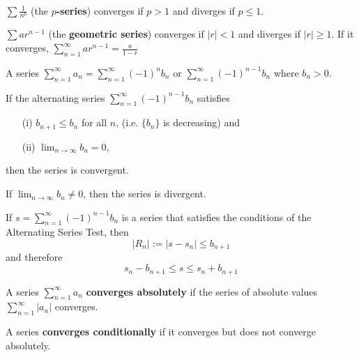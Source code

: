 \begin{theorem} \ \\
  $\sum \frac{1}{n^p}$ (the \textbf{$p$-series}) converges if $p > 1$ and diverges if $p \leq 1$.

  $\sum ar^{n-1}$ (the \textbf{geometric series}) converges if $|r| < 1$ and diverges if $|r| \geq 1$. If it converges, $\displaystyle\sum_{n=1}^\infty ar^{n-1} = \frac{a}{1-r}$
\end{theorem}

\begin{definition} A series $\sum_{n=1}^\infty a_n = \sum_{n=1}^\infty (-1)^n b_n \text{ or } \sum_{n=1}^\infty (-1)^{n - 1} b_n$ where $b_n > 0$.
\end{definition}

\begin{theorem} If the alternating series $\sum_{n=1}^\infty (-1)^{n - 1} b_n$ satisfies
  \begin{enumerate}
    \item[(i)] $b_{n + 1} \leq b_n$ for all $n$, (i.e. $\{ b_n \}$ is decreasing) and
    \item[(ii)] $\displaystyle\lim_{n \to \infty} b_n = 0$,
  \end{enumerate}
  then the series is convergent.
\end{theorem}

\begin{theorem} If $\displaystyle\lim_{n \to \infty} b_n \neq 0$, then the series is divergent.
\end{theorem}

\begin{theorem} If $s = \sum_{n=1}^\infty (-1)^{n - 1} b_n$ is a series that satisfies the conditions of the Alternating Series Test, then
  \[
    |R_n| := |s - s_n| \leq b_{n + 1}
  \]
  and therefore
  \[
    s_n - b_{n + 1} \leq s \leq s_n + b_{n + 1}
  \]
\end{theorem}

\begin{definition} A series $\sum_{n = 1}^\infty a_n$ \textbf{converges absolutely} if the series of absolute values $\sum_{n = 1}^\infty |a_n|$ converges.
\end{definition}

\begin{definition} A series \textbf{converges conditionally} if it converges but does not converge absolutely.
\end{definition}

